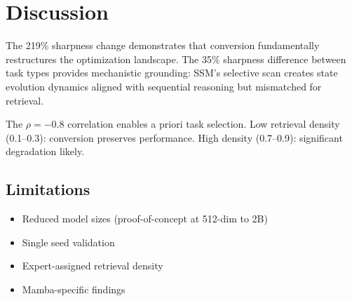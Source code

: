 \section{Discussion}

The 219\% sharpness change demonstrates that conversion fundamentally restructures the optimization landscape. The 35\% sharpness difference between task types provides mechanistic grounding: SSM's selective scan creates state evolution dynamics aligned with sequential reasoning but mismatched for retrieval.

The $\rho=-0.8$ correlation enables a priori task selection. Low retrieval density (0.1--0.3): conversion preserves performance. High density (0.7--0.9): significant degradation likely.

\subsection{Limitations}

\begin{itemize}
    \item Reduced model sizes (proof-of-concept at 512-dim to 2B)
    \item Single seed validation
    \item Expert-assigned retrieval density
    \item Mamba-specific findings
\end{itemize}
